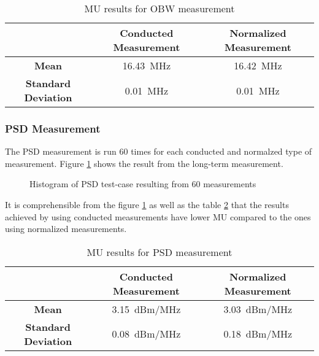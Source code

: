 \begin{table}[H]
  \centering
\begin {tabular} {|c|c|c|} 
\toprule
 & \textbf{Conducted Measurement} & \textbf{Normalized Measurement} \\ 
\midrule 
\textbf{Mean} & 16.43~MHz & 16.42~MHz\\
\textbf{Standard Deviation} & 0.01~MHz & 0.01~MHz\\
\bottomrule
 \end{tabular}
  \caption{\acf{MU} results for \acs{OBW} measurement} \label{tab:tab1}
\end{table}

\subsubsection{\acf{PSD} Measurement}
The \acs{PSD} measurement is run 60 times for each conducted and normalzed type of measurement. Figure
\ref{fig:otavscond2} shows the result from the long-term measurement.
\begin{figure}[H]
\centering
{}
\caption{Histogram of \acs{PSD} test-case resulting from 60 measurements }
\label{fig:otavscond2} 
\end{figure}
It is comprehensible from the figure \ref{fig:otavscond2} as well as the table \ref{tab:tab2} that the results achieved by using conducted measurements have lower \acs{MU} compared to the ones using normalized measurements.
\begin{table}[H]
  \centering
\begin {tabular} {|c|c|c|} 
\toprule
 & \textbf{Conducted Measurement} & \textbf{Normalized Measurement} \\ 
\midrule 
\textbf{Mean} & 3.15~dBm/MHz & 3.03~dBm/MHz\\
\textbf{Standard Deviation} & 0.08~dBm/MHz & 0.18~dBm/MHz\\
\bottomrule
 \end{tabular}
  \caption{\acf{MU} results for \acs{PSD} measurement} \label{tab:tab2}
\end{table}


